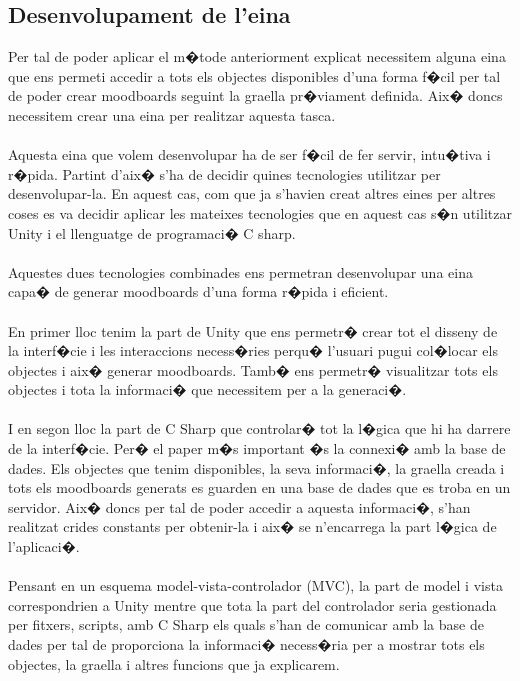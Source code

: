 \documentclass[12pt,a4paper,openright,oneside]{article}
\numberwithin{equation}{section}
\theoremstyle{definition}
\begin{document}
\subsection{Desenvolupament de l'eina}

Per tal de poder aplicar el m�tode anteriorment explicat necessitem alguna eina que ens permeti accedir a tots els objectes disponibles d'una forma f�cil per tal de poder crear moodboards seguint la graella pr�viament definida. Aix� doncs necessitem crear una eina per realitzar aquesta tasca. \\\\
Aquesta eina que volem desenvolupar ha de ser f�cil de fer servir, intu�tiva i r�pida. Partint d'aix� s'ha de decidir quines tecnologies utilitzar per desenvolupar-la. En aquest cas, com que ja s'havien creat altres eines per altres coses es va decidir aplicar les mateixes tecnologies que en aquest cas s�n utilitzar Unity i el llenguatge de programaci� C sharp.\\\\
Aquestes dues tecnologies combinades ens permetran desenvolupar una eina capa� de generar moodboards d'una forma r�pida i eficient.\\\\
En primer lloc tenim la part de Unity que ens permetr� crear tot el disseny de la interf�cie i les interaccions necess�ries perqu� l'usuari pugui col�locar els objectes i aix� generar moodboards. Tamb� ens permetr� visualitzar tots els objectes i tota la informaci� que necessitem per a la generaci�. \\\\
I en segon lloc la part de C Sharp que controlar� tot la l�gica que hi ha darrere de la interf�cie. Per� el paper m�s important �s la connexi� amb la base de dades. Els objectes que tenim disponibles, la seva informaci�, la graella creada i tots els moodboards generats es guarden en una base de dades que es troba en un servidor. Aix� doncs per tal de poder accedir a aquesta informaci�, s'han realitzat crides constants per obtenir-la i aix� se n'encarrega la part l�gica de l'aplicaci�. \\\\
Pensant en un esquema model-vista-controlador (MVC), la part de model i vista correspondrien a Unity mentre que tota la part del controlador seria gestionada per fitxers, scripts, amb C Sharp els quals s'han de comunicar amb la base de dades per tal de proporciona la informaci� necess�ria per a mostrar tots els objectes, la graella i altres funcions que ja explicarem.
\end{document}
